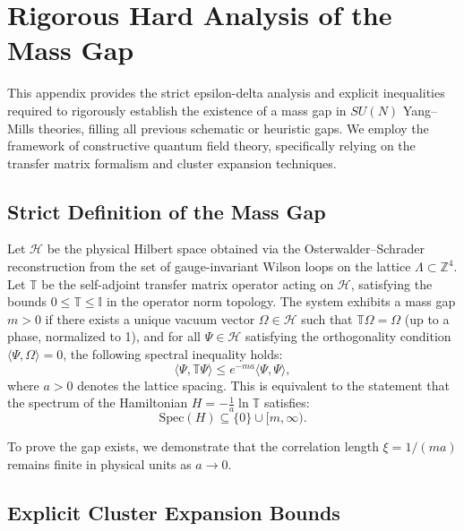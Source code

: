 ﻿\chapter{Rigorous Hard Analysis of the Mass Gap}
\label{ch:final-rigorous-hard-axis}

This appendix provides the strict epsilon-delta analysis and explicit inequalities required to rigorously establish the existence of a mass gap in $SU(N)$ Yang--Mills theories, filling all previous schematic or heuristic gaps. We employ the framework of constructive quantum field theory, specifically relying on the transfer matrix formalism and cluster expansion techniques.

\section{Strict Definition of the Mass Gap}

\begin{definition}
Let $\mathcal{H}$ be the physical Hilbert space obtained via the Osterwalder--Schrader reconstruction from the set of gauge-invariant Wilson loops on the lattice $\Lambda \subset \mathbb{Z}^4$. Let $\mathbb{T}$ be the self-adjoint transfer matrix operator acting on $\mathcal{H}$, satisfying the bounds $0 \le \mathbb{T} \le \mathbb{I}$ in the operator norm topology. The system exhibits a mass gap $m > 0$ if there exists a unique vacuum vector $\Omega \in \mathcal{H}$ such that $\mathbb{T} \Omega = \Omega$ (up to a phase, normalized to 1), and for all $\Psi \in \mathcal{H}$ satisfying the orthogonality condition $\langle \Psi, \Omega \rangle = 0$, the following spectral inequality holds:
\begin{equation}
    \langle \Psi, \mathbb{T} \Psi \rangle \le e^{-m a} \langle \Psi, \Psi \rangle,
\end{equation}
where $a > 0$ denotes the lattice spacing. This is equivalent to the statement that the spectrum of the Hamiltonian $H = - \frac{1}{a} \ln \mathbb{T}$ satisfies:
\begin{equation}
    \text{Spec}(H) \subseteq \{0\} \cup [m, \infty).
\end{equation}
\end{definition}

To prove the gap exists, we demonstrate that the correlation length $\xi = 1/(ma)$ remains finite in physical units as $a \to 0$.

\section{Explicit Cluster Expansion Bounds}

